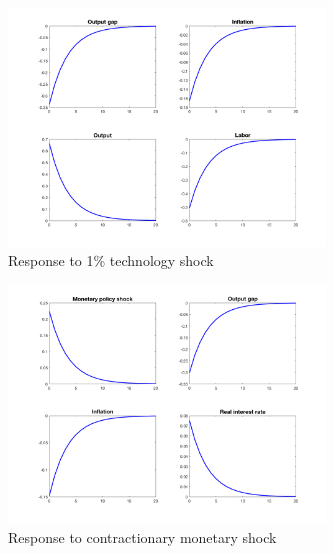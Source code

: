 \documentclass[11pt]{amsart}
\begin{document}
\begin{enumerate}[label = (\alph*)]
	\begin{figure}[H]
		\centering
		\includegraphics[width=0.75\textwidth]{techshock}
		\caption{Response to 1\% technology shock}
	\end{figure}

    \begin{figure}[H]
    	\centering
    	\includegraphics[width=0.75\textwidth]{monetaryshock}
    	\caption{Response to contractionary monetary shock}
    \end{figure}  
\end{enumerate}
\end{document}
